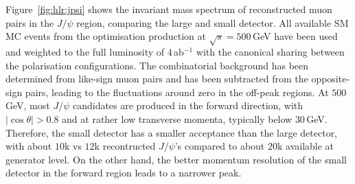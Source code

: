 Figure~\ref{fig:hlr:jpsi} shows the invariant mass spectrum of reconstructed muon pairs in the $J/\psi$ region, comparing the large and small detector. All available
SM MC events from the optimisation production at $\sqrt{s}=500$\,GeV have been used and weighted to the full luminosity of $4$\,ab$^{-1}$ with the canonical sharing between the polarisation configurations. The combinatorial background has been determined from like-sign muon pairs and has been subtracted from the opposite-sign pairs, leading to the fluctuations around zero in the off-peak regions.
At $500$\,GeV, most $J/\psi$ candidates are produced in the forward direction, with $|\cos{\theta}|>0.8$ and at rather low transverse momenta, typically below $30$\,GeV.
Therefore, the small detector has a smaller acceptance than the large detector, with about $10$k vs $12$k recontructed $J/\psi$'s compared to about $20$k available at generator level. On the other hand, the better momentum resolution of the small detector in the forward region leads to a narrower peak.


